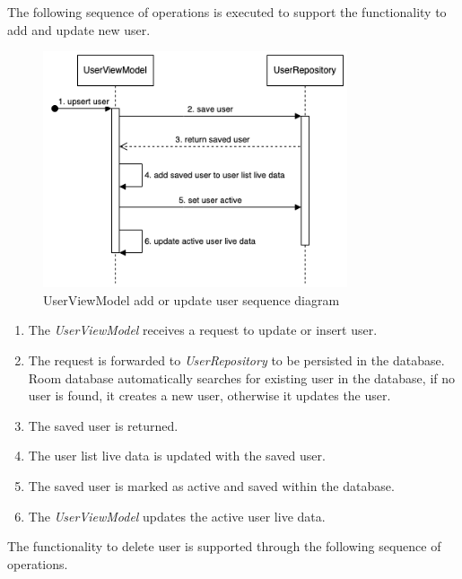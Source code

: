 The following sequence of operations is executed to support the functionality to add and update new user.
\begin{figure}[H]
    \centering
    \includegraphics[width=0.8\textwidth]{diagrams/upsert-user-vm.drawio.png}
    \caption{UserViewModel add or update user sequence diagram}
    \label{fig:userviewmodel_upsertuser}
\end{figure}

\begin{enumerate}
    \item The \emph{UserViewModel} receives a request to update or insert user.
    \item The request is forwarded to \emph{UserRepository} to be persisted in the database. Room database automatically searches for existing user in the database, if no user is found, it creates a new user, otherwise it updates the user.
    \item The saved user is returned.
    \item The user list live data is updated with the saved user.
    \item The saved user is marked as active and saved within the database.
    \item The \emph{UserViewModel} updates the active user live data.
\end{enumerate}

The functionality to delete user is supported through the following sequence of operations.
